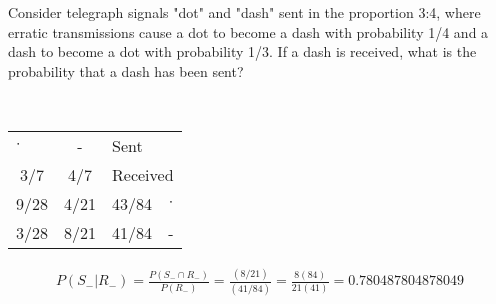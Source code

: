 \documentclass[answers]{exam}
\begin{document}
\begin{questions}
\question 
Consider telegraph signals "dot" and "dash" sent in the proportion 3:4, where erratic transmissions cause a dot to become a dash with probability 1/4 and a dash to become a dot with probability 1/3. If a dash is received, what is the probability that a dash has been sent?
\begin{solution} \\
	\begin{tabular}{cc|cc}
		\multicolumn{1}{l}{$\cdot$} & -    & \multicolumn{1}{l}{Sent} & \multicolumn{1}{l}{} \\
		3/7                         & 4/7  & \multicolumn{2}{r}{Received}                    \\ \hline
		9/28                        & 4/21 & 43/84                    & $\cdot$              \\
		3/28                        & 8/21 & 41/84                    & -                   
	\end{tabular}
	\begin{align*}
		P(S_-|R_-)
		= \frac{P(S_-\cap R_-)}{P(R_-)}
		= \frac{(8/21)}{(41/84)}
		= \frac{8(84)}{21(41)}
		= 0.780487804878049
	\end{align*}
\end{solution}






\question 

\begin{solution}
	
\end{solution}
	
\question 

\begin{solution}
	
\end{solution}

\end{questions}
\end{document}
